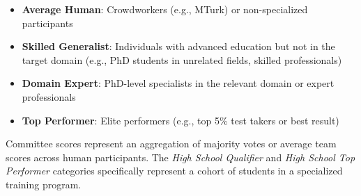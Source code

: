 \documentclass[letterpaper,twocolumn]{article}
\begin{document}
\begin{itemize}
    \item \textbf{Average Human}: Crowdworkers (e.g., MTurk) or non-specialized participants
    \item \textbf{Skilled Generalist}: Individuals with advanced education but not in the target domain (e.g., PhD students in unrelated fields, skilled professionals)
    \item \textbf{Domain Expert}: PhD-level specialists in the relevant domain or expert professionals
    \item \textbf{Top Performer}: Elite performers (e.g., top 5\% test takers or best result)
\end{itemize}

Committee scores represent an aggregation of majority votes or average team scores across human participants. The \textit{High School Qualifier} and \textit{High School Top Performer} categories specifically represent a cohort of students in a specialized training program. 
\end{document}
